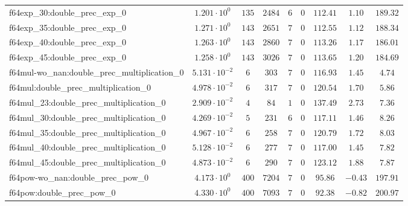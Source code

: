 \begin{tabular}{|l|c|c|c|c|c|c|c|c|}
f64exp\_30:double\_prec\_exp\_0                & $ 1.201 \cdot 10^{0}  $ & $ 135    $ & $ 2484  $ & $ 6   $ & $ 0      $ & $ 112.41      $ & $ 1.10    $ & $ 189.32  $ \\
f64exp\_35:double\_prec\_exp\_0                & $ 1.271 \cdot 10^{0}  $ & $ 143    $ & $ 2651  $ & $ 7   $ & $ 0      $ & $ 112.55      $ & $ 1.12    $ & $ 188.34  $ \\
f64exp\_40:double\_prec\_exp\_0                & $ 1.263 \cdot 10^{0}  $ & $ 143    $ & $ 2860  $ & $ 7   $ & $ 0      $ & $ 113.26      $ & $ 1.17    $ & $ 186.01  $ \\
f64exp\_45:double\_prec\_exp\_0                & $ 1.258 \cdot 10^{0}  $ & $ 143    $ & $ 3026  $ & $ 7   $ & $ 0      $ & $ 113.65      $ & $ 1.20    $ & $ 184.69  $ \\
f64mul-wo\_nan:double\_prec\_multiplication\_0 & $ 5.131 \cdot 10^{-2} $ & $ 6      $ & $ 303   $ & $ 7   $ & $ 0      $ & $ 116.93      $ & $ 1.45    $ & $ 4.74    $ \\
f64mul:double\_prec\_multiplication\_0         & $ 4.978 \cdot 10^{-2} $ & $ 6      $ & $ 317   $ & $ 7   $ & $ 0      $ & $ 120.54      $ & $ 1.70    $ & $ 5.86    $ \\
f64mul\_23:double\_prec\_multiplication\_0     & $ 2.909 \cdot 10^{-2} $ & $ 4      $ & $ 84    $ & $ 1   $ & $ 0      $ & $ 137.49      $ & $ 2.73    $ & $ 7.36    $ \\
f64mul\_30:double\_prec\_multiplication\_0     & $ 4.269 \cdot 10^{-2} $ & $ 5      $ & $ 231   $ & $ 6   $ & $ 0      $ & $ 117.11      $ & $ 1.46    $ & $ 8.26    $ \\
f64mul\_35:double\_prec\_multiplication\_0     & $ 4.967 \cdot 10^{-2} $ & $ 6      $ & $ 258   $ & $ 7   $ & $ 0      $ & $ 120.79      $ & $ 1.72    $ & $ 8.03    $ \\
f64mul\_40:double\_prec\_multiplication\_0     & $ 5.128 \cdot 10^{-2} $ & $ 6      $ & $ 277   $ & $ 7   $ & $ 0      $ & $ 117.00      $ & $ 1.45    $ & $ 7.82    $ \\
f64mul\_45:double\_prec\_multiplication\_0     & $ 4.873 \cdot 10^{-2} $ & $ 6      $ & $ 290   $ & $ 7   $ & $ 0      $ & $ 123.12      $ & $ 1.88    $ & $ 7.87    $ \\
f64pow-wo\_nan:double\_prec\_pow\_0            & $ 4.173 \cdot 10^{0}  $ & $ 400    $ & $ 7204  $ & $ 7   $ & $ 0      $ & $ 95.86       $ & $ -0.43   $ & $ 197.91  $ \\
f64pow:double\_prec\_pow\_0                    & $ 4.330 \cdot 10^{0}  $ & $ 400    $ & $ 7093  $ & $ 7   $ & $ 0      $ & $ 92.38       $ & $ -0.82   $ & $ 200.97  $ \\

\end{tabular}
